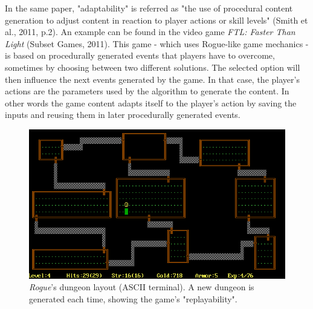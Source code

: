 In the same paper, "adaptability" is referred as "the use of procedural content generation to adjust content in reaction to player actions or skill levels" (Smith et al., 2011, p.2)\cite{pdf:pcgbased}. An example can be found in the video game \textit{FTL: Faster Than Light} (Subset Games, 2011)\cite{game:ftl}. This game - which uses Rogue-like game mechanics - is based on procedurally generated events that players   have to overcome, sometimes by choosing between two different solutions. The selected option will then influence the next events generated by the game. In that case, the player's actions are the parameters used by the algorithm to generate the content. In other words the game content adapts itself to the player's action by saving the inputs and reusing them in later procedurally generated events.
\begin{figure}[h]
    \centering
    \includegraphics[scale=0.4]{Images/Rogue.png}
    \caption{\textit{Rogue}'s dungeon layout (ASCII terminal). A new dungeon is generated each time, showing the game's "replayability".}
    \label{fig:Rogue}
\end{figure}
\\\\
\\\\
